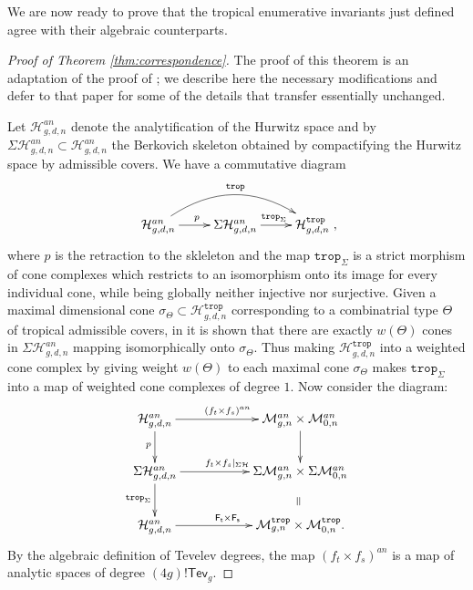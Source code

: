 \documentclass[11pt,reqno]{amsart}
\theoremstyle{definition}
\newcommand\trop{{\mathtt{trop}}}
\newcommand\Mgn[1]{\mathcal M_{#1}}
\newcommand\Hur[1]{\mathcal H_{#1}}
\newcommand{\Ft}{\mathsf{F_t}}
\newcommand{\Fs}{\mathsf{F_s}}
\newcommand{\Tev}{{\mathsf{Tev}}}
\begin{document}
We are now ready to prove that the tropical enumerative invariants just defined agree with their algebraic counterparts.

\begin{proof}[Proof of Theorem \ref{thm:correspondence}]
    The proof of this theorem is an adaptation of the proof of \cite[Theorem 2]{CMRadmissible}; we describe here the necessary modifications and defer to that paper for some of the details that transfer essentially unchanged.

 Let $\Hur{g,d,n}^{an}$ denote the analytification of the Hurwitz space and by $\Sigma\Hur{g,d,n}^{an}\subset \Hur{g,d,n}^{an}$ the Berkovich skeleton obtained by compactifying the Hurwitz space by admissible covers.
 We have a commutative diagram
 \begin{equation}\label{eq:hurwtropdiag}
     \xymatrix{ 
\Hur{g,d,n}^{an}\ar[r]^{p} \ar@/^2pc/[rr]^{\trop} & \Sigma\Hur{g,d,n}^{an}\ar[r]^{\trop_\Sigma} & \Hur{g,d,n}^\trop},
 \end{equation}
where $p$ is the retraction to the skleleton and the map $\trop_\Sigma$ is a strict morphism of cone complexes which restricts to an isomorphism onto its image for every individual cone, while being globally neither injective nor surjective. Given a maximal dimensional cone $\sigma_\Theta\subset \Hur{g,d,n}^\trop$ corresponding to a combinatrial type $\Theta$ of tropical admissible covers, in \cite[Section 4.2.2, Theorem 2]{CMRadmissible} it is shown that there are exactly $w(\Theta)$ cones in $\Sigma\Hur{g,d,n}^{an}$ mapping isomorphically onto $\sigma_\Theta$. Thus making $\Hur{g,d,n}^\trop$ into a weighted cone complex by giving weight $w(\Theta)$ to each maximal cone $\sigma_\Theta$ makes $\trop_\Sigma$ into a map of weighted cone complexes of degree $1$.
Now consider the diagram:
\begin{equation}
\xymatrix{
\Hur{g,d,n}^{an} \ar[rr]^{(f_t\times f_s)^{an}} \ar[d]_p  & & \Mgn{g,n}^{an} \times \Mgn{0,n}^{an} \ar[d]\\
\Sigma\Hur{g,d,n}^{an} \ar[rr]^{f_t\times f_s\vert_{\Sigma\Hur{}}} \ar[d]_{\trop_\Sigma} & & \Sigma\Mgn{g,n}^{an} \times \Sigma\Mgn{0,n}^{an} \ar@{}[d]|*[@]{=}\\
\Hur{g,d,n}^{an} \ar[rr]^{\Ft\times\Fs}& & \Mgn{g,n}^\trop \times \Mgn{0,n}^\trop.
}
\end{equation}
By the algebraic definition of Tevelev degrees, the map $(f_t\times f_s)^{an}$ is a map of analytic spaces of degree $(4g)! \Tev_g$.

\end{proof}
\end{document}
